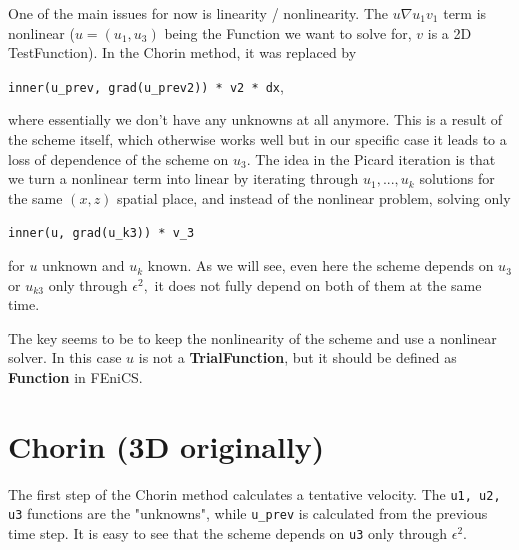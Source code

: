 \documentclass[11pt]{article}
\begin{document}
One of the main issues for now is linearity / nonlinearity. The $u \nabla u_1 v_1$ term is nonlinear ($u = (u_1, u_3)$ being the Function we want to solve for, $v$ is a 2D TestFunction). In the Chorin method, it was replaced by

\texttt{inner(u\_prev, grad(u\_prev2)) * v2 * dx},

where essentially we don't have any unknowns at all anymore. This is a result of the scheme itself, which otherwise works well but in our specific case it leads to a loss of dependence of the scheme on $u_3.$ The idea in the Picard iteration is that we turn a nonlinear term into linear by iterating through $u_1, ... , u_k$ solutions for the same $(x,z)$ spatial place, and instead of the nonlinear problem, solving only

\texttt{inner(u, grad(u\_k3)) * v\_3}

for $u$ unknown and $u_k$ known. As we will see, even here the scheme depends on $u_3$ or $u_{k3}$ only through $\epsilon^2,$ it does not fully depend on both of them at the same time.

The key seems to be to keep the nonlinearity of the scheme and use a nonlinear solver. In this case $u$ is not a \textbf{TrialFunction}, but it should be defined as \textbf{Function} in FEniCS. 

\section{Chorin (3D originally)}

The first step of the Chorin method calculates a tentative velocity. The \texttt{u1, u2, u3} functions are the "unknowns", while \texttt{u\_prev} is calculated from the previous time step. It is easy to see that the scheme depends on \texttt{\textcolor{terracotta}{u3}} only through $\epsilon^2.$
\end{document}
